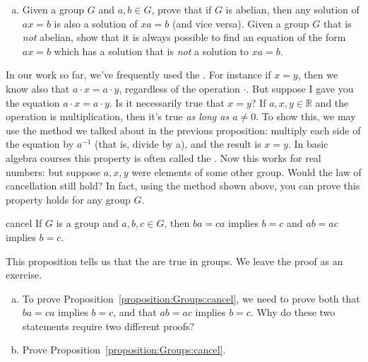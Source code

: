 \begin{exercise}{54}
\begin{enumerate}[(a)]
\item
Given a group $G$ and $a, b \in G$, prove that if $G$ is abelian, then any solution of $ax = b$ is also a solution of $xa = b$ (and vice versa).
Given a group $G$  that is \emph{not} abelian, show that it is always possible to find an equation of the form $ax = b$ which has a solution that is \emph{not} a solution to $xa = b$.
\end{enumerate}
\end{exercise}

In our work so far, we've frequently used the .  For instance if $x = y$, then we know also that $a\cdot x = a \cdot y$, regardless of the operation $\cdot$.   But suppose I gave you the equation $a \cdot x = a \cdot y$.  Is it necessarily true that $x = y$?  If $a, x,y \in {\mathbb R}$ and the operation is multiplication, then it's true \emph{as long as $a \neq 0$}.  To show this, we may use  the method we talked about in the previous proposition:  multiply each side of the equation by $a^{-1}$ (that is, divide by a), and the result is $x = y$.  In basic algebra courses this property is often called the .  
Now this works for real numbers: but suppose $a,x,y$ were elements of some other group.  Would the law of cancellation still hold?  In fact, using the method shown above, you can prove this property holds for any group $G$. 

\begin{prop}{cancel}
If $G$ is a group and $a, b, c \in G$, then $ba = ca$ implies $b = c$
and $ab = ac$ implies $b = c$. 
\end{prop} 
 
This proposition tells us that the  are true in groups.  We leave the proof as an exercise.

\begin{exercise}{56}
\begin{enumerate}[(a)]
\item
To prove  Proposition~\ref{proposition:Groups:cancel}, we need to prove both that   $ba = ca$ implies $b = c$,  and that $ab = ac$ implies $b = c$. Why do these two statements require two different proofs?
\item
Prove Proposition~\ref{proposition:Groups:cancel}.
\end{enumerate}
\end{exercise} 
 
